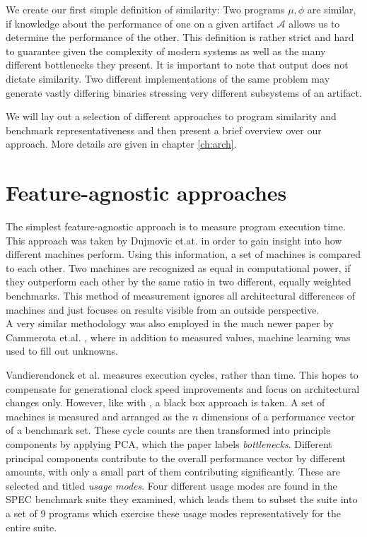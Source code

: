 \documentclass[../bachelor_paper.tex]{subfiles}
\begin{document}
We create our first simple definition of similarity: Two programs $\mu, \phi$ are similar, if knowledge about the performance of one on a given artifact $\mathcal{A}$ allows us to determine the performance of the other. This definition is rather strict and hard to guarantee given the complexity of modern systems as well as the many different bottlenecks they present. It is important to note that output does not dictate similarity. Two different implementations of the same problem may generate vastly differing binaries stressing very different subsystems of an artifact.

We will lay out a selection of different approaches to program similarity and benchmark representativeness and then present a brief overview over our approach. More details are given in chapter \ref{ch:arch}.

\section{Feature-agnostic approaches}
	\label{prob/angno}
The simplest feature-agnostic approach is to measure program execution time. This approach was taken by Dujmovic et.at. \cite{dujmovicEvolutionEvaluationSPEC1998} in order to gain insight into how different machines perform. Using this information, a set of machines is compared to each other. Two machines are recognized as equal in computational power, if they outperform each other by the same ratio in two different, equally weighted benchmarks. This method of measurement ignores all architectural differences of machines and just focuses on results visible from an outside perspective.\\
A very similar methodology was also employed in the much newer paper by Cammerota et.al. \cite{cammarotaOptimizingProgramPerformance2013}, where in addition to measured values, machine learning was used to fill out unknowns.

Vandierendonck et al. \cite{vandierendonckManyBenchmarksStress} measures execution cycles, rather than time. This hopes to compensate for generational clock speed improvements and focus on architectural changes only. However, like with \cite{dujmovicEvolutionEvaluationSPEC1998}, a black box approach is taken. A set of machines is measured and arranged as the $n$ dimensions of a performance vector of a benchmark set. These cycle counts are then transformed into principle components by applying \ac{PCA}, which the paper labels \emph{bottlenecks}. Different principal components contribute to the overall performance vector by different amounts, with only a small part of them contributing significantly. These are selected and titled \emph{usage modes}. Four different usage modes are found in the \ac{SPEC} benchmark suite they examined, which leads them to subset the suite into a set of 9 programs which exercise these usage modes representatively for the entire suite.
\end{document}
